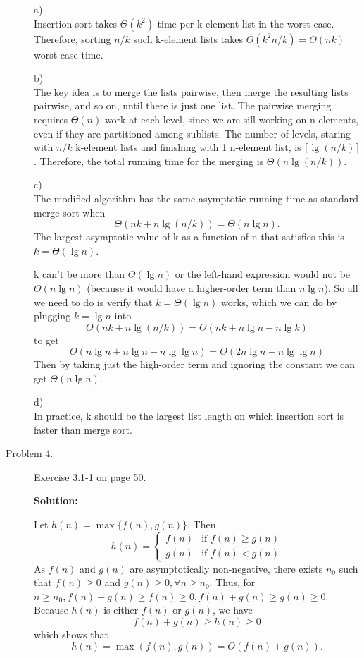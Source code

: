 \documentclass[11pt]{article}
\begin{document}
\begin{description}
a)\\
Insertion sort takes $\Theta(k^2)$ time per k-element list in the
worst case. Therefore, sorting $n/k$ such k-element lists takes
$\Theta(k^2n/k)=\Theta(nk)$ worst-case time.

b)\\

The key idea is to merge the lists pairwise, then merge the
resulting lists pairwise, and so on, until there is just one list.
The pairwise merging requires $\Theta(n)$ work at each level,
since we are sill working on n elements, even if they are
partitioned among sublists. The number of levels, staring with
$n/k$ k-element lists and finishing with 1 n-element list, is
$\lceil \lg(n/k) \rceil$. Therefore, the total running time for
the merging is $\Theta(n\lg (n/k))$.

c)\\
The modified algorithm has the same asymptotic running time as
standard merge sort when
$$
\Theta(nk+n\lg(n/k))=\Theta(n\lg n).
$$
The largest asymptotic value of k as a function of n that
satisfies this is $k=\Theta(\lg n)$.

k can't be more than $\Theta(\lg n)$  or the left-hand expression
would not be $\Theta(n\lg n)$ (because it would have a
higher-order term than $n\lg n$). So all we need to do is verify
that $k=\Theta(\lg n)$ works, which we can do by plugging $ k=\lg
n$ into
$$
\Theta(nk+n\lg (n/k))=\Theta(nk+n\lg n - n\lg k)
$$
to get
$$
\Theta(n\lg n + n\lg n - n\lg \lg n)=\Theta(2n\lg n - n\lg \lg n)
$$
Then by taking just the high-order term and ignoring the constant
we can get $\Theta(n\lg n)$.

d)\\
In practice, k should be the largest list length on which
insertion sort is faster than merge sort.

\item[Problem 4.] Exercise 3.1-1 on page 50.

\noindent \textbf{Solution:}

Let $h(n)=\max\{f(n), g(n)\}$. Then
$$
h(n) = \left\{ \begin{array}{ll}
f(n) & \textrm{if $f(n)\ge g(n)$}\\
g(n) & \textrm{if $f(n)< g(n)$}
\end{array} \right.
$$
As $f(n)$ and $g(n)$ are asymptotically non-negative, there exists
$n_0$ such that $f(n)\ge 0$ and $g(n)\ge 0, \forall n\ge n_0$.
Thus, for $n\ge n_0, f(n)+g(n) \ge f(n) \ge 0,  f(n)+g(n) \ge g(n)
\ge 0$. Because $h(n)$ is either $f(n)$ or $g(n)$, we have
$$
f(n) + g(n) \ge h(n) \ge 0
$$
which shows that
$$
h(n)=\max (f(n), g(n))= O(f(n) +g(n)).
$$


\end{description}
\end{document}
